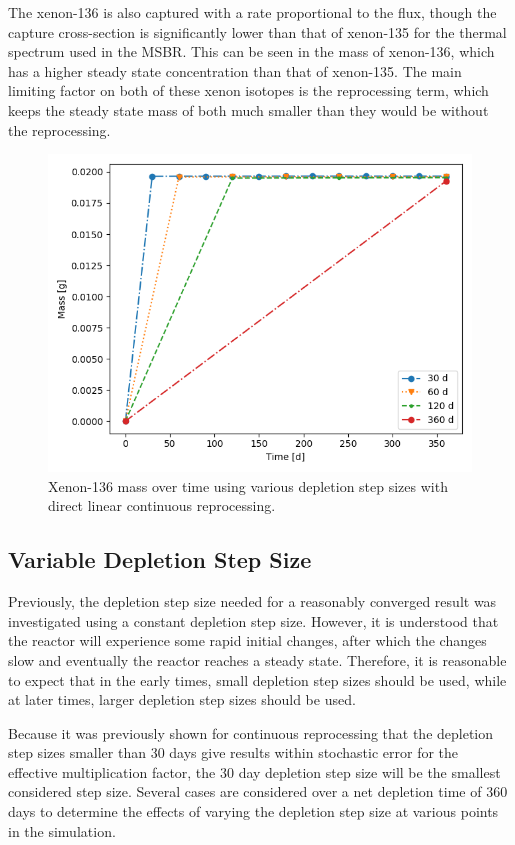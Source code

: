 The xenon-136 is also captured with a rate proportional to the flux, though the capture cross-section is significantly lower than that of xenon-135 for the thermal spectrum used in the MSBR. This can be seen in the mass of xenon-136, which has a higher steady state concentration than that of xenon-135. The main limiting factor on both of these xenon isotopes is the reprocessing term, which keeps the steady state mass of both much smaller than they would be without the reprocessing.

\begin{figure}[H]
  \centering
  \includegraphics[scale=0.7]{images/DL_NSTEP_Xe-136_mass-large.png}
  \caption{Xenon-136 mass over time using various depletion step sizes with direct linear continuous reprocessing.}
   \label{fig:DL-cont-xe136-2}
\end{figure}


\subsection{Variable Depletion Step Size}

Previously, the depletion step size needed for a reasonably converged result was investigated using a constant depletion step size. However, it is understood that the reactor will experience some rapid initial changes, after which the changes slow and eventually the reactor reaches a steady state. Therefore, it is reasonable to expect that in the early times, small depletion step sizes should be used, while at later times, larger depletion step sizes should be used.

Because it was previously shown for continuous reprocessing that the depletion step sizes smaller than 30 days give results within stochastic error for the effective multiplication factor, the 30 day depletion step size will be the smallest considered step size. Several cases are considered over a net depletion time of 360 days to determine the effects of varying the depletion step size at various points in the simulation.

